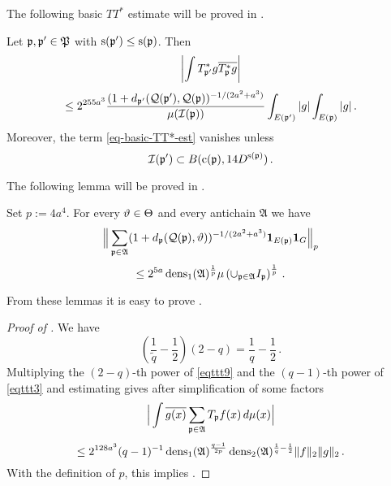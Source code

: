 The following basic $TT^*$ estimate will be proved in .
\begin{lemma}
    \label{tile-correlation}
    \leanok
    Let ${\mathfrak p}, {\mathfrak p}'\in {\mathfrak P}$ with
    ${\mathrm{s}}({{\mathfrak p}'})\leq {\mathrm{s}}({{\mathfrak p}})$.
    Then
    \begin{equation}
        \label{eq-basic-TT*-est}
        \left|\int T^*_{{\mathfrak p}'}g\overline{T^*_{{\mathfrak p}}g}\right|
    \end{equation}
    \begin{equation}
        \le 2^{255a^3}\frac{(1+d_{{\mathfrak p}'}({\mathcal{Q}}({\mathfrak p}'), {\mathcal{Q}}({\mathfrak p}))^{-1/(2a^2+a^3)}}{\mu({\mathcal{I}}({\mathfrak p}))}\int_{E({\mathfrak p}')}|g|\int_{E({\mathfrak p})}|g|\,.
    \end{equation}
    Moreover, the term \eqref{eq-basic-TT*-est} vanishes unless
    \begin{equation}
        {\mathcal{I}}({\mathfrak p}') \subset B({\mathrm{c}}({\mathfrak p}), 14D^{{\mathrm{s}}({\mathfrak p})})\, .
    \end{equation}
\end{lemma}

The following lemma will be proved in .
\begin{lemma}
    \label{antichain-tile-count}
\leanok
{}
    Set $p:=4a^4$. For every ${\vartheta}\in{\Theta}$ and every antichain $\mathfrak{A}$ we have
    \begin{equation}
        \label{eq-antichain-Lp}
        \Big\|\sum_{{\mathfrak p}\in\mathfrak{A}}(1+d_{{\mathfrak p}}({\mathcal{Q}}({\mathfrak p}), {\vartheta}))^{-1/(2a^2+a^3)}\mathbf{1}_{E({\mathfrak p})}\mathbf{1}_G\Big\|_{p}
    \end{equation}
    \begin{equation}
        \le
        2^{5a}\operatorname{\operatorname{dens}}_1(\mathfrak{A})^{\frac 1p}\mu\left(\cup_{{\mathfrak p}\in\mathfrak{A}}I_{{\mathfrak p}}\right)^{\frac 1p}\, .
    \end{equation}
\end{lemma}

From these lemmas it is easy to prove .
\begin{proof}[Proof of ]
\leanok
We have
\begin{equation}
    \left(\frac 1{\tilde{q}} -\frac 12\right) (2-q)= \frac 1q -\frac 12\,.
\end{equation}
Multiplying the $(2-q)$-th power of \eqref{eqttt9} and the $(q-1)$-th power of \eqref{eqttt3}
and estimating gives after simplification of some factors
\begin{equation}\label{eqttt8}
    \Big|\int \overline{g(x)} \sum_{{\mathfrak p} \in \mathfrak{A}} T_{{\mathfrak p}} f(x)\, d\mu(x)\Big|
\end{equation}
 \begin{equation}
    \le 2^{128a^3}(q-1)^{-1} \operatorname{\operatorname{dens}}_1(\mathfrak{A})^{\frac {q-1}{2p}}\operatorname{\operatorname{dens}}_2(\mathfrak{A})^{\frac 1{q}-\frac 12} \|f\|_2\|g\|_2\, .
\end{equation}
With the definition of $p$, this implies
.
\end{proof}


